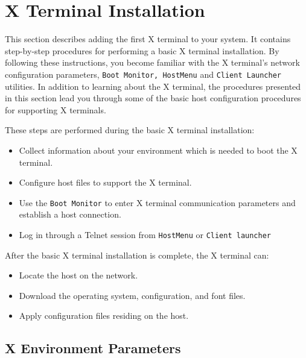 \section {X Terminal Installation}

This section describes adding the first X terminal to your system. It contains
step-by-step procedures for performing a basic X terminal installation. By
following these instructions, you become familiar with the X terminal's network
configuration parameters, {\tt Boot Monitor, HostMenu} and {\tt Client Launcher}
utilities. In addition to learning about the X terminal, the procedures
presented in this section lead you through some of the basic host configuration
procedures for supporting X terminals.

These steps are performed during the basic X terminal installation:

\begin {itemize}

\item Collect information about your environment which is needed to boot the
X terminal.

\item Configure host files to support the X terminal.

\item Use the {\tt Boot Monitor} to enter X terminal communication parameters
and establish a host connection.

\item Log in through a Telnet session from {\tt HostMenu} or
{\tt Client launcher}

\end {itemize}

After the basic X terminal installation is complete, the X terminal can:

\begin {itemize}

\item Locate the host on the network.

\item Download the operating system, configuration, and font files.

\item Apply configuration files residing on the host.

\end {itemize}


\subsection {X Environment Parameters}

